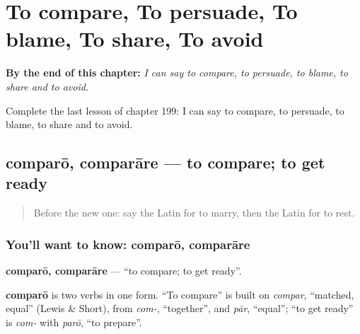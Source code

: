 
\chapter{To compare, To persuade, To blame, To share, To avoid}
\label{ch:la-to-compare-to-persuade-to-blame-to-share-to-avoid}

\begin{chapteropening}
\textbf{By the end of this chapter:} \emph{I can say to compare, to persuade, to blame, to share and to avoid.}

Complete the last lesson of chapter 199: I can say to compare, to persuade, to blame, to share and to avoid.
\end{chapteropening}

\section[comparō, comparāre]{comparō, comparāre — to compare; to get ready}

\label{lesson:LA-C199-comparo}



\begin{quote}
Before the new one: say the Latin for to marry, then the Latin for to rest.
\end{quote}

\subsection*{You'll want to know: comparō, comparāre}
\textbf{comparō, comparāre} — \textquotedblleft{}to compare; to get ready\textquotedblright{}.

\begin{cousinweb}
\textbf{comparō} is two verbs in one form. \textquotedblleft{}To compare\textquotedblright{} is built on \emph{compar}, \textquotedblleft{}matched, equal\textquotedblright{} (Lewis \& Short), from \emph{com-}, \textquotedblleft{}together\textquotedblright{}, and \emph{pār}, \textquotedblleft{}equal\textquotedblright{}; \textquotedblleft{}to get ready\textquotedblright{} is \emph{com-} with \emph{parō}, \textquotedblleft{}to prepare\textquotedblright{}.
\end{cousinweb}

